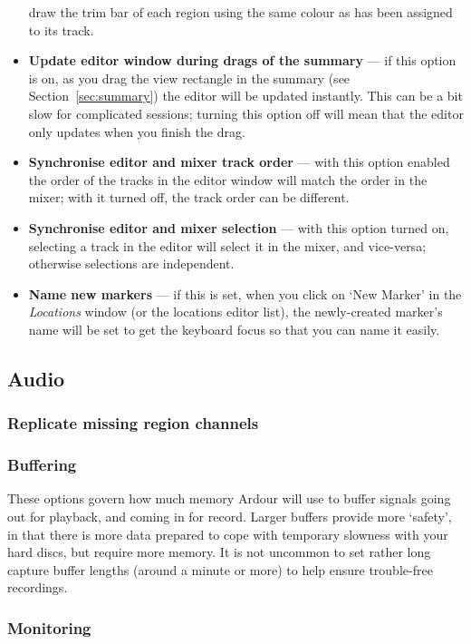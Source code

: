 \documentclass[10pt,a4paper]{book}
\newcommand{\todo}[1]{\marginpar{\small\texttt{#1}}}
\begin{document}
\begin{itemize}
  draw the trim bar of each region using the same colour as has been
  assigned to its track. \todo{if not?}
\item \textbf{Update editor window during drags of the summary} --- if
  this option is on, as you drag the view rectangle in the summary
  (see Section~\ref{sec:summary}) the editor will be updated
  instantly.  This can be a bit slow for complicated sessions; turning
  this option off will mean that the editor only updates when you
  finish the drag.
\item \textbf{Synchronise editor and mixer track order} --- with this
  option enabled the order of the tracks in the editor window will
  match the order in the mixer; with it turned off, the track order
  can be different.
\item \textbf{Synchronise editor and mixer selection} --- with this
  option turned on, selecting a track in the editor will select it in
  the mixer, and vice-versa; otherwise selections are independent.
\item \textbf{Name new markers} --- if this is set, when you click on
  `New Marker' in the \emph{Locations} window (or the locations editor
  list), the newly-created marker's name will be set to get the
  keyboard focus so that you can name it easily.
\end{itemize}

\subsection{Audio}

\subsubsection{Replicate missing region channels}

\subsubsection{Buffering}

These options govern how much memory Ardour will use to buffer signals
going out for playback, and coming in for record.  Larger buffers
provide more `safety', in that there is more data prepared to cope
with temporary slowness with your hard discs, but require more memory.
It is not uncommon to set rather long capture buffer lengths (around a
minute or more) to help ensure trouble-free recordings.

\subsubsection{Monitoring}
\end{document}
